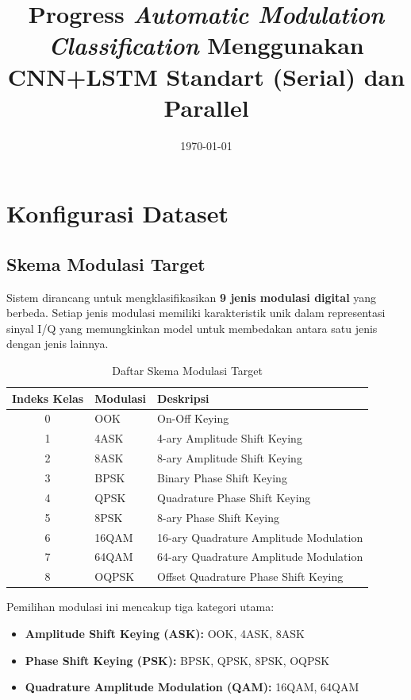 \documentclass{article}
\title{Progress \textit{Automatic Modulation Classification} Menggunakan CNN+LSTM Standart (Serial) dan Parallel}
\date{\today}
\begin{document}
\maketitle
\section{Konfigurasi Dataset}

\subsection{Skema Modulasi Target}
Sistem dirancang untuk mengklasifikasikan \textbf{9 jenis modulasi digital} yang berbeda. Setiap jenis modulasi memiliki karakteristik unik dalam representasi sinyal I/Q yang memungkinkan model untuk membedakan antara satu jenis dengan jenis lainnya.

\begin{table}[h]
\centering
\caption{Daftar Skema Modulasi Target}
\label{tab:target_modulations}
\begin{tabular}{|c|l|l|}
\hline
\textbf{Indeks Kelas} & \textbf{Modulasi} & \textbf{Deskripsi} \\
\hline
0 & OOK & On-Off Keying \\
1 & 4ASK & 4-ary Amplitude Shift Keying \\
2 & 8ASK & 8-ary Amplitude Shift Keying \\
3 & BPSK & Binary Phase Shift Keying \\
4 & QPSK & Quadrature Phase Shift Keying \\
5 & 8PSK & 8-ary Phase Shift Keying \\
6 & 16QAM & 16-ary Quadrature Amplitude Modulation \\
7 & 64QAM & 64-ary Quadrature Amplitude Modulation \\
8 & OQPSK & Offset Quadrature Phase Shift Keying \\
\hline
\end{tabular}
\end{table}

Pemilihan modulasi ini mencakup tiga kategori utama:
\begin{itemize}
    \item \textbf{Amplitude Shift Keying (ASK):} OOK, 4ASK, 8ASK
    \item \textbf{Phase Shift Keying (PSK):} BPSK, QPSK, 8PSK, OQPSK  
    \item \textbf{Quadrature Amplitude Modulation (QAM):} 16QAM, 64QAM
\end{itemize}
\end{document}
